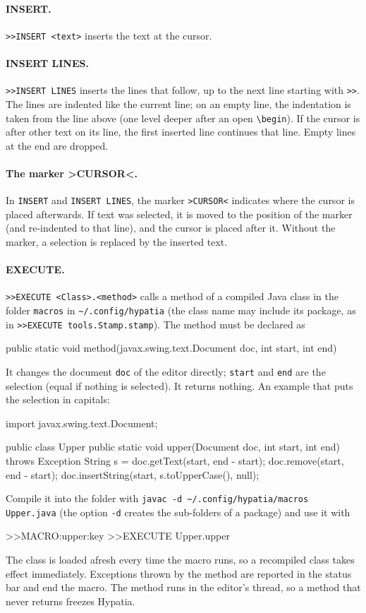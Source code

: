 \documentclass[11pt]{article}
\newcommand{\file}[1]{\texttt{#1}}
\newcommand{\cfgdir}{\texttt{\textasciitilde/.config/hypatia}}
\newcommand{\gt}{\textgreater}
\begin{document}
    \paragraph{INSERT.}
    \verb+>>INSERT <text>+ inserts the text at the cursor.

    \paragraph{INSERT LINES.}
    \verb+>>INSERT LINES+ inserts the lines that follow, up to the next line starting with \verb+>>+. The lines are indented like the current line; on an empty line, the indentation is taken from the line above (one level deeper after an open \verb+\begin+). If the cursor is after other text on its line, the first inserted line continues that line. Empty lines at the end are dropped.

    \paragraph{The marker \gt CURSOR\textless.}
    In \verb+INSERT+ and \verb+INSERT LINES+, the marker \verb+>CURSOR<+ indicates where the cursor is placed afterwards. If text was selected, it is moved to the position of the marker (and re-indented to that line), and the cursor is placed after it. Without the marker, a selection is replaced by the inserted text.

    \paragraph{EXECUTE.}
    \verb+>>EXECUTE <Class>.<method>+ calls a method of a compiled Java class in the folder \file{macros} in \cfgdir{} (the class name may include its package, as in \verb+>>EXECUTE tools.Stamp.stamp+). The method must be declared as
    \begin{Code}
public static void method(javax.swing.text.Document doc, int start, int end)
    \end{Code}
    It changes the document \verb+doc+ of the editor directly; \verb+start+ and \verb+end+ are the selection (equal if nothing is selected). It returns nothing. An example that puts the selection in capitals:
    \begin{Code}
import javax.swing.text.Document;

public class Upper {
    public static void upper(Document doc, int start, int end) throws Exception {
        String s = doc.getText(start, end - start);
        doc.remove(start, end - start);
        doc.insertString(start, s.toUpperCase(), null);
    }
}
    \end{Code}
    Compile it into the folder with \verb+javac -d ~/.config/hypatia/macros Upper.java+ (the option \verb+-d+ creates the sub-folders of a package) and use it with
    \begin{Code}
>>MACRO:upper:key
>>EXECUTE Upper.upper
    \end{Code}
    The class is loaded afresh every time the macro runs, so a recompiled class takes effect immediately. Exceptions thrown by the method are reported in the status bar and end the macro. The method runs in the editor's thread, so a method that never returns freezes Hypatia.
\end{document}
